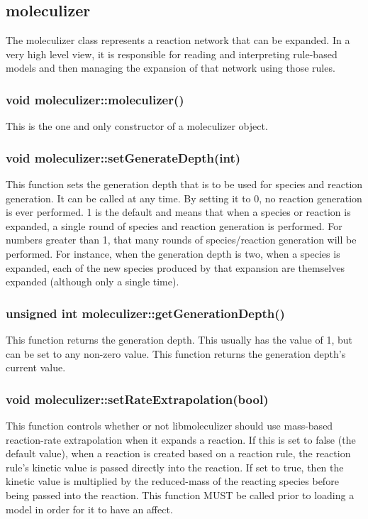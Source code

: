 \subsection{moleculizer}

The moleculizer class represents a reaction network that can be
expanded.  In a very high level view, it is responsible for reading
and interpreting rule-based models and then managing the expansion of
that network using those rules.  

\subsubsection{void moleculizer::moleculizer()}
This is the one and only constructor of a moleculizer object.  

\subsubsection{ void moleculizer::setGenerateDepth(int)}
This function sets the generation depth that is to be used for species
and reaction generation.  It can be called at any time.  By setting it
to 0, no reaction generation is ever performed.  1 is the default and
means that when a species or reaction is expanded, a single round of
species and reaction generation is performed.  For numbers greater
than 1, that many rounds of species/reaction generation will be
performed.  For instance, when the generation depth is two, when a
species is expanded, each of the new species produced by that
expansion are themselves expanded (although only a single time).  


\subsubsection{unsigned int moleculizer::getGenerationDepth()}
This function returns the generation depth.  This usually has the
value of 1, but can be set to any non-zero value.  This function
returns the generation depth's current value. 

\subsubsection{void moleculizer::setRateExtrapolation(bool)}
This function controls whether or not libmoleculizer should use mass-based reaction-rate
extrapolation when it expands a reaction.  If this is set to false
(the default value), when a reaction is created based on a reaction
rule, the reaction rule's kinetic value is passed directly into the
reaction.  If set to true, then the kinetic value is multiplied by the
reduced-mass of the reacting species before being passed into the
reaction.  This function MUST be called prior to loading a model in
order for it to have an affect.  

